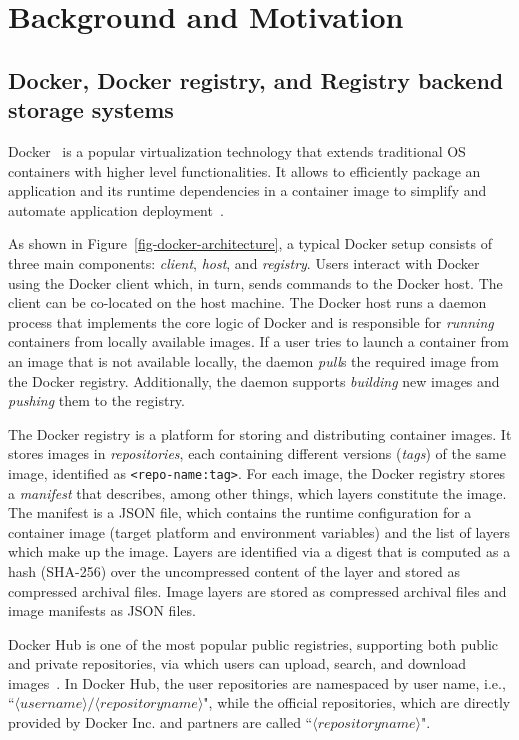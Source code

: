 \section{Background and Motivation}
\label{sec:background}

\subsection{Docker, Docker registry, and Registry backend storage systems}
Docker~\cite{docker} is a popular virtualization technology that extends traditional OS containers with higher level functionalities.
It allows to efficiently package an application and its runtime dependencies in a container image to simplify and automate application deployment~\cite{slacker}.



As shown in Figure~\ref{fig-docker-architecture}, a typical Docker setup consists of three main components: \emph{client}, \emph{host}, and \emph{registry}.
Users interact with Docker using the Docker client which, in turn, sends commands to the Docker host.
The client can be co-located on the host machine. 
The Docker host runs a daemon process that implements the core logic of Docker and is responsible for \emph{running} containers from locally available images.
If a user tries to launch a container from an image that is not available locally, the daemon \emph{pull}s the required image from the Docker registry.
Additionally, the daemon supports \emph{building} new images and \emph{pushing} them to the registry.

The Docker registry is a platform for storing and distributing container images.
It stores images in \emph{repositories}, each containing different versions (\emph{tags}) of the same image, identified as \texttt{<repo-name:tag>}.
For each image, the Docker registry stores a \emph{manifest} that describes, among other things, which layers constitute the image.
The manifest is a JSON file, which contains the runtime configuration for a container image (\eg target platform and environment variables) 
and the list of layers which make up the image.
Layers are identified via a digest that is computed as a hash (SHA-256) over the uncompressed content of the layer and stored as compressed archival files.
Image layers are stored as compressed archival files and image manifests as JSON files.

Docker Hub is one of the most popular public registries, supporting both public and private repositories, via which users can upload, search, and
download images~\cite{docker-hub}.
In Docker Hub, the user repositories are namespaced by user name, i.e., ``$\langle username\rangle/\langle repository name \rangle$", while the
official repositories, which are directly provided by Docker Inc. and partners are called ``$\langle repository name \rangle$".

